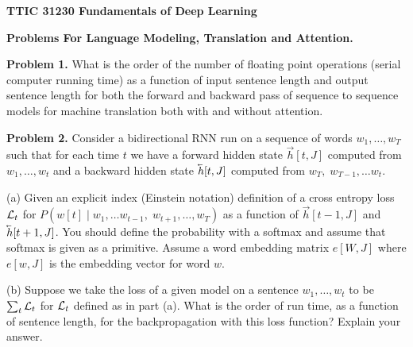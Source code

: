 \documentclass{article}
\begin{document}
\centerline{\bf TTIC 31230 Fundamentals of Deep Learning}
\medskip
\centerline{\bf Problems For Language Modeling, Translation and Attention.}

\bigskip
\bigskip
{\bf Problem 1.} What is the order of the number of floating point operations (serial computer running time)
as a function of input sentence length and output sentence length
for both the forward and backward pass of sequence to sequence models for machine translation both with and without attention.

\bigskip
{\bf Problem 2.} Consider a bidirectional RNN run on a sequence of words $w_1,\ldots,w_T$ such that for each time $t$ we have a forward
hidden state $\vec{h}[t,J]$ computed from $w_1,\ldots,w_t$ and a backward hidden state $\cev{h}[t,J]$ computed from $w_T,\;w_{T-1},\ldots w_t$.

\medskip
(a) Given an explicit index (Einstein notation) definition of a cross entropy loss ${\cal L}_t$ for $P(w[t]\;|\;w_1,\ldots w_{t-1},\;w_{t+1},\ldots,w_T)$ as a function of
$\vec{h}[t-1,J]$ and $\cev{h}[t+1,J]$. You should define
the probability with a softmax and assume that softmax is given as a primitive.  Assume a word embedding matrix $e[W,J]$ where $e[w,J]$ is the embedding vector for word $w$.

\medskip
(b) Suppose we take the loss of a given model on a sentence $w_1,\ldots,w_t$ to be $\sum_t {\cal L}_t$ for ${\cal L}_t$ defined as in part (a).  What is the order
of run time, as a function of sentence length, for the backpropagation with this loss function?  Explain your answer.
\end{document}
